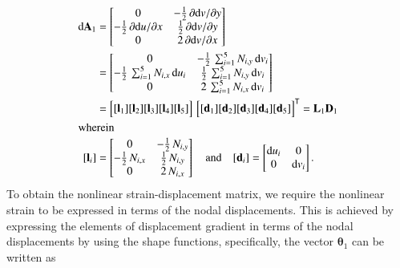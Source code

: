 \begin{subequations}
	\begin{align}
	\mathrm{d} \mathbf{A}_1 & =  \begin{bmatrix}
	0 &  - \tfrac{1}{2} \, \partial \mathrm{d} v / \partial y \\
	-\tfrac{1}{2} \, \partial \mathrm{d} u / \partial x &  \tfrac{1}{2} \, \partial \mathrm{d} v / \partial y \\
	0  & 2 \, \partial \mathrm{d} v / \partial x  \end{bmatrix} \notag \\
	& = \begin{bmatrix}
	0 &  - \tfrac{1}{2} \, \sum\nolimits_{i=1}^5 N_{i,y} \, \mathrm{d} v_i \\
	-\tfrac{1}{2} \, \sum\nolimits_{i=1}^5 N_{i,x} \, \mathrm{d} u_i &  \tfrac{1}{2} \, \sum\nolimits_{i=1}^5 N_{i,y} \, \mathrm{d} v_i \\
	0  & 2 \, \sum\nolimits_{i=1}^5 N_{i,x} \, \mathrm{d} v_i  \end{bmatrix}\notag \\
	& = \begin{bmatrix}
	[\mathbf{l}_1] [\mathbf{l}_2] [\mathbf{l}_3] [\mathbf{l}_4] [\mathbf{l}_5] 
	\end{bmatrix} \, \begin{bmatrix} [\mathbf{d}_1] [\mathbf{d}_2] [\mathbf{d}_3] [\mathbf{d}_4] [\mathbf{d}_5] \end{bmatrix}^{\mathsf{T}}
	= \mathbf{L}_1 \mathbf{D}_1 \\
	\intertext{wherein}
	[\mathbf{l}_i] & = \begin{bmatrix}
	0 &  - \tfrac{1}{2} \, N_{i,y} \\
	-\tfrac{1}{2} \, N_{i,x} &  \tfrac{1}{2} \, N_{i,y} \\
	0 & 2 \, N_{i,x} \end{bmatrix}  \quad \text{and} \quad	[\mathbf{d}_i] = \begin{bmatrix}
	\mathrm{d} u_i & 0 \\
	0 &  \mathrm{d} v_i  \end{bmatrix} .
	\end{align}
\end{subequations}
To obtain the nonlinear strain-displacement matrix, we require the nonlinear strain to be expressed in terms of the nodal displacements. This is achieved by expressing the elements of displacement gradient in terms of the nodal displacements by using the shape functions, specifically, the vector $\boldsymbol{\theta}_1$ can be written as
